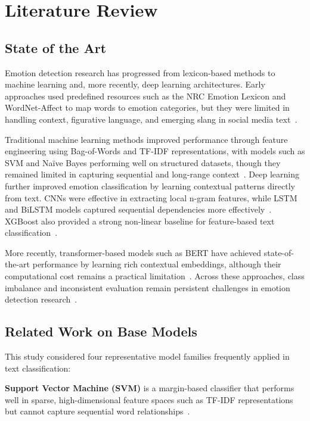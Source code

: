 \section{Literature Review}
\label{sec:literature}

\subsection{State of the Art}

Emotion detection research has progressed from lexicon-based methods to machine learning and, more recently, deep learning architectures. Early approaches used predefined resources such as the NRC Emotion Lexicon and WordNet-Affect to map words to emotion categories, but they were limited in handling context, figurative language, and emerging slang in social media text~\citep{mohammad2013crowdsourcing, strapparava2008learning}.

Traditional machine learning methods improved performance through feature engineering using Bag-of-Words and TF-IDF representations, with models such as SVM and Na\"ive Bayes performing well on structured datasets, though they remained limited in capturing sequential and long-range context~\citep{dzikovska2012using, wang2018emotion}. Deep learning further improved emotion classification by learning contextual patterns directly from text. CNNs were effective in extracting local n-gram features, while LSTM and BiLSTM models captured sequential dependencies more effectively~\citep{hasan2019emotion, sun2023bidirectional}. XGBoost also provided a strong non-linear baseline for feature-based text classification~\citep{chen2016xgboost}.

More recently, transformer-based models such as BERT have achieved state-of-the-art performance by learning rich contextual embeddings, although their computational cost remains a practical limitation~\citep{acheampong2021transformer, devlin2019bert}. Across these approaches, class imbalance and inconsistent evaluation remain persistent challenges in emotion detection research~\citep{nandwani2021review}.

\subsection{Related Work on Base Models}

This study considered four representative model families frequently applied in text classification:

\noindent\textbf{Support Vector Machine (SVM)} is a margin-based classifier that performs well in sparse, high-dimensional feature spaces such as TF-IDF representations but cannot capture sequential word relationships~\citep{dzikovska2012using}.

